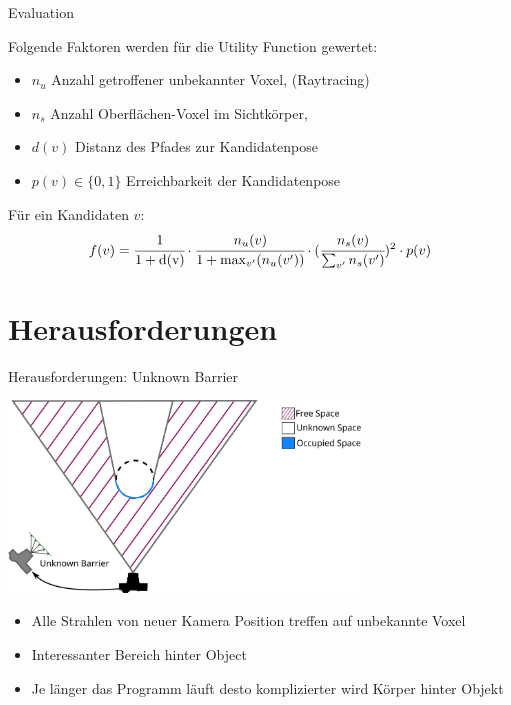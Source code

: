 \documentclass{beamer}
\begin{document}
\begin{frame}{Evaluation}
	\begin{block}{}
		Folgende Faktoren werden für die Utility Function gewertet:
		\begin{itemize}
			\item $n_{u}$ Anzahl getroffener unbekannter Voxel, (Raytracing)
			\item $n_s$ Anzahl Oberflächen-Voxel im Sichtkörper,
			\item $d(v)$ Distanz des Pfades zur Kandidatenpose
			\item $p(v) \in \{0,1\}$ Erreichbarkeit der Kandidatenpose
		\end{itemize}
		Für ein Kandidaten $v$:
		\[f(v) = \cfrac{1}{1 + \text{d(v)}} \cdot \cfrac{n_{u}(v)}{1 + \max_{v'}(n_{u}(v'))} \cdot (\cfrac{n_s(v)}{\sum_{v'}n_s(v')})^2 \cdot p(v)\]
	\end{block}
\end{frame}
\section{Herausforderungen}
\begin{frame}{Herausforderungen: Unknown Barrier}
	\begin{block}{}
		\begin{center}
			\includegraphics[width=0.7\textwidth]{Graphics/unknown_barrier_v2.png}
		\end{center}
		\begin{itemize}
			\item Alle Strahlen von neuer Kamera Position treffen auf unbekannte Voxel
			\item Interessanter Bereich hinter Object
			\item Je länger das Programm läuft desto komplizierter wird Körper hinter Objekt
		\end{itemize}
	\end{block}
\end{frame}
\end{document}
